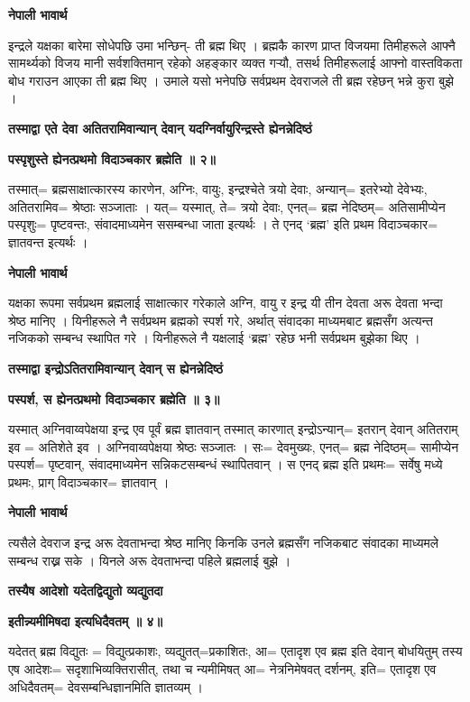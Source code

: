 \documentclass[11pt, a5paper]{article}
\begin{document}
\textbf{नेपाली भावार्थ}

इन्द्रले यक्षका बारेमा सोधेपछि उमा भन्छिन्- ती ब्रह्म थिए । ब्रह्मकै कारण प्राप्त विजयमा तिमीहरूले आफ्नै सामर्थ्यको विजय मानी सर्वशक्तिमान् रहेको अहङ्कार व्यक्त गर्‍यौ, तसर्थ तिमीहरूलाई आफ्नो वास्तविकता बोध गराउन आएका ती ब्रह्म थिए । उमाले यसो भनेपछि सर्वप्रथम देवराजले ती ब्रह्म रहेछन् भन्ने कुरा बुझे ।

\textbf{तस्माद्वा एते देवा अतितरामिवान्यान् देवान् यदग्निर्वायुरिन्द्रस्ते ह्येनन्नेदिष्ठं}

\textbf{पस्पृशुस्ते ह्येनत्प्रथमो विदाञ्चकार ब्रह्मेति  ॥ २॥}

तस्मात्= ब्रह्मसाक्षात्कारस्य कारणेन, अग्निः, वायुः, इन्द्रश्चेते त्रयो देवाः, अन्यान्= इतरेभ्यो देवेभ्यः, अतितरामिव= श्रेष्ठाः सञ्जाताः । यत्= यस्मात्, ते= त्रयो देवाः, एनत्= ब्रह्म नेदिष्ठम्=  अतिसामीप्येन पस्पृशुः‍= पृष्टवन्तः, संवादमाध्यमेन ससम्बन्धा जाता इत्यर्थः । ते एनद् ‘ब्रह्म’ इति प्रथम विदाञ्चकार= ज्ञातवन्त इत्यर्थः ।

\textbf{नेपाली भावार्थ}

यक्षका रूपमा सर्वप्रथम ब्रह्मलाई साक्षात्कार गरेकाले अग्नि, वायु र इन्द्र यी तीन देवता अरू देवता भन्दा श्रेष्ठ मानिए । यिनीहरूले नै सर्वप्रथम ब्रह्मको स्पर्श गरे, अर्थात् संवादका माध्यमबाट ब्रह्मसँग अत्यन्त नजिकको सम्बन्ध स्थापित गरे । यिनीहरूले नै यक्षलाई ‘ब्रह्म’ रहेछ भनी सर्वप्रथम बुझेका थिए ।

\textbf{तस्माद्वा इन्द्रोऽतितरामिवान्यान् देवान् स ह्येनन्नेदिष्ठं}

\textbf{पस्पर्श, स ह्येनत्प्रथमो विदाञ्चकार ब्रह्मेति ॥ ३॥}

यस्मात् अग्निवाय्वपेक्षया इन्द्र एव पूर्वं ब्रह्म ज्ञातवान् तस्मात् कारणात् इन्द्रोऽन्यान्= इतरान् देवान् अतितराम् इव = अतिशेते इव । अग्निवाय्वपेक्षया श्रेष्ठः सञ्जातः । सः= देवमुख्यः, एनत्= ब्रह्म नेदिष्ठम्= सामीप्येन पस्पर्श= पृष्टवान्, संवादमाध्यमेन सन्निकटसम्बन्धं स्थापितवान् । स एनद् ब्रह्म इति प्रथमः= सर्वेषु मध्ये प्रथमः, प्राग् विदाञ्चकार= ज्ञातवान् ।

\textbf{नेपाली भावार्थ}

त्यसैले देवराज इन्द्र अरू देवताभन्दा श्रेष्ठ मानिए किनकि उनले ब्रह्मसँग नजिकबाट संवादका माध्यमले सम्बन्ध राख्न सके । यिनले अरू देवताभन्दा पहिले ब्रह्मलाई बुझे ।

\textbf{तस्यैष आदेशो यदेतद्विद्युतो व्यद्युतदा}

\textbf{इतीन्न्यमीमिषदा इत्यधिदैवतम् ॥ ४॥}

यदेतत् ब्रह्म विद्युतः = विद्युत्प्रकाशः, व्यद्युतत्=प्रकाशितः, आ= एतादृश एव ब्रह्म इति देवान् बोधयितुम् तस्य एष आदेशः‍= सदृशाभिव्यक्तिरासीत्, तथा च न्यमीमिषत् आ= नेत्रनिमेषवत् दर्शनम्, इति= एतादृश एव अधिदैवतम्= देवसम्बन्धिज्ञानमिति ज्ञातव्यम् ।
\end{document}
